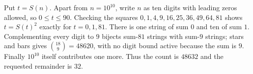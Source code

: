Put $t=S(n)$. Apart from $n=10^{10}$, write $n$ as ten digits with leading zeros allowed, so $0\le t\le90$. Checking the squares $0,1,4,9,16,25,36,49,64,81$ shows $t=S(t)^2$ exactly for $t=0,1,81$. There is one string of sum $0$ and ten of sum $1$. Complementing every digit to $9$ bijects sum-$81$ strings with sum-$9$ strings; stars and bars gives $\binom{18}{9}=48620$, with no digit bound active because the sum is $9$. Finally $10^{10}$ itself contributes one more. Thus the count is $48632$ and the requested remainder is $\boxed{32}$.
